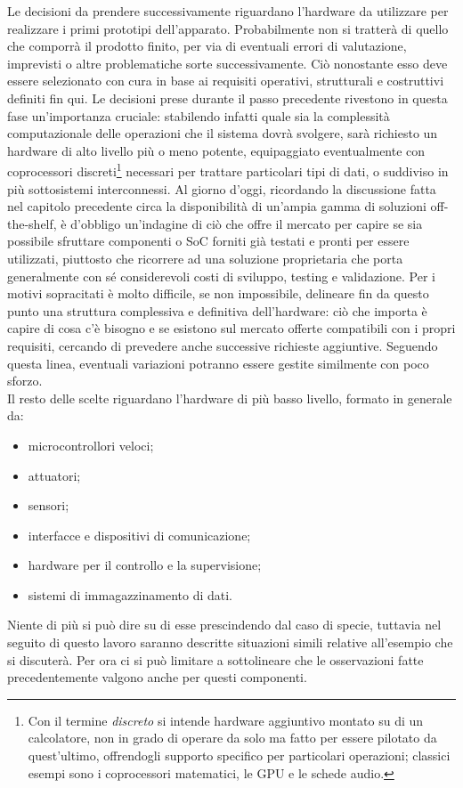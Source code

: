 \indent Le decisioni da prendere successivamente riguardano l'hardware da utilizzare per realizzare i primi prototipi dell'apparato. Probabilmente non si tratterà di quello che comporrà il prodotto finito, per via di eventuali errori di valutazione, imprevisti o altre problematiche sorte successivamente. Ciò nonostante esso deve essere selezionato con cura in base ai requisiti operativi, strutturali e costruttivi definiti fin qui. Le decisioni prese durante il passo precedente rivestono in questa fase un'importanza cruciale: stabilendo infatti quale sia la complessità computazionale delle operazioni che il sistema dovrà svolgere, sarà richiesto un hardware di alto livello più o meno potente, equipaggiato eventualmente con coprocessori discreti\footnote{Con il termine \emph{discreto} si intende hardware aggiuntivo montato su di un calcolatore, non in grado di operare da solo ma fatto per essere pilotato da quest'ultimo, offrendogli supporto specifico per particolari operazioni; classici esempi sono i coprocessori matematici, le GPU e le schede audio.} necessari per trattare particolari tipi di dati, o suddiviso in più sottosistemi interconnessi. Al giorno d'oggi, ricordando la discussione fatta nel capitolo precedente circa la disponibilità di un'ampia gamma di soluzioni off-the-shelf, è d'obbligo un'indagine di ciò che offre il mercato per capire se sia possibile sfruttare componenti o SoC forniti già testati e pronti per essere utilizzati, piuttosto che ricorrere ad una soluzione proprietaria che porta generalmente con sé considerevoli costi di sviluppo, testing e validazione. Per i motivi sopracitati è molto difficile, se non impossibile, delineare fin da questo punto una struttura complessiva e definitiva dell'hardware: ciò che importa è capire di cosa c'è bisogno e se esistono sul mercato offerte compatibili con i propri requisiti, cercando di prevedere anche successive richieste aggiuntive. Seguendo questa linea, eventuali variazioni potranno essere gestite similmente con poco sforzo.\\
Il resto delle scelte riguardano l'hardware di più basso livello, formato in generale da:
\begin{itemize}
    \item microcontrollori veloci;
    \item attuatori;
    \item sensori;
    \item interfacce e dispositivi di comunicazione;
    \item hardware per il controllo e la supervisione;
    \item sistemi di immagazzinamento di dati.
\end{itemize}
Niente di più si può dire su di esse prescindendo dal caso di specie, tuttavia nel seguito di questo lavoro saranno descritte situazioni simili relative all'esempio che si discuterà. Per ora ci si può limitare a sottolineare che le osservazioni fatte precedentemente valgono anche per questi componenti.

